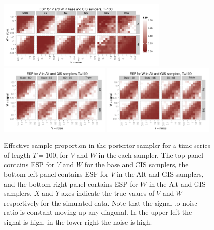 \documentclass[12pt]{article}
\begin{document}
\begin{figure}[!h]
\centering
\includegraphics[width=0.75\textwidth]{basecisESplot100}
\includegraphics[width=0.49\textwidth]{altintESplotV100}
\includegraphics[width=0.49\textwidth]{altintESplotW100}
\caption{Effective sample proportion in the posterior sampler for a time series of length $T=100$, for $V$ and $W$ in the each sampler. The top panel contains ESP for $V$ and $W$ for the base and CIS samplers, the bottom left panel contains ESP for $V$ in the Alt and GIS samplers, and the bottom right panel contains ESP for $W$ in the Alt and GIS samplers. $X$ and $Y$ axes indicate the true values of $V$ and $W$ respectively for the simulated data. Note that the signal-to-noise ratio is constant moving up any diagonal. In the upper left the signal is high, in the lower right the noise is high.}
\label{ESplot}
\end{figure}
\end{document}
